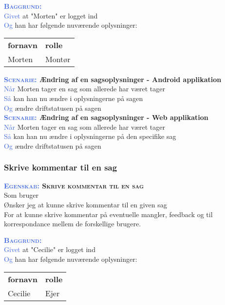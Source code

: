 \textsc{\textcolor{RoyalBlue}{\textbf{Baggrund:}}}\\
\textcolor{RoyalBlue}{Givet} at "Morten" er logget ind\\
\textcolor{RoyalBlue}{Og} han har følgende nuværende oplysninger:\\
\begin{tabular}{| l | l |}
	\textbf{fornavn} & \textbf{rolle} \\
	Morten & Montør\\
\end{tabular}
\newline \newline


\textbf{\textsc{\textcolor{RoyalBlue}{Scenarie:}} Ændring af en sagsoplysninger - Android applikation}\\
\textcolor{RoyalBlue}{Når} Morten tager en sag som allerede har været tager\\
\textcolor{RoyalBlue}{Så} kan han nu ændre i oplysningerne på sagen\\
\textcolor{RoyalBlue}{Og} ændre driftstatusen på sagen\\

\textbf{\textsc{\textcolor{RoyalBlue}{Scenarie:}} Ændring af en sagsoplysninger - Web applikation}\\
\textcolor{RoyalBlue}{Når} Morten tager en sag som allerede har været tager\\
\textcolor{RoyalBlue}{Så} kan han nu ændre i oplysningerne på den specifike sag\\
\textcolor{RoyalBlue}{Og} ændre driftstatusen på sagen\\

\subsubsection{Skrive kommentar til en sag}
\textbf{\textsc{\textcolor{RoyalBlue}{Egenskab:} Skrive kommentar til en sag}}\\
Som bruger\\
Ønsker jeg at kunne skrive kommentar til en given sag\\
For at kunne skrive kommentar på eventuelle mangler, feedback og til korrespondance mellem de forskellige brugere.

\textsc{\textcolor{RoyalBlue}{\textbf{Baggrund:}}}\\
\textcolor{RoyalBlue}{Givet} at "Cecilie" er logget ind\\
\textcolor{RoyalBlue}{Og} han har følgende nuværende oplysninger:\\
\begin{tabular}{| l | l |}
	\textbf{fornavn} & \textbf{rolle} \\
	Cecilie & Ejer\\
\end{tabular}
\newline \newline

